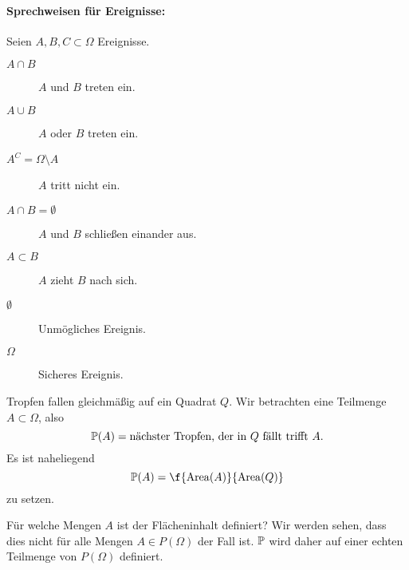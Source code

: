 \paragraph{Sprechweisen für Ereignisse:}
Seien $A, B, C \subset \Omega$ Ereignisse.
\begin{description}
	\item[$A \cap B$]
		$A$ und $B$ treten ein.
	\item[$A \cup B$]
		$A$ oder $B$ treten ein.
	\item[$A^C = \Omega \setminus A$]
		$A$ tritt nicht ein.
	\item[$A \cap B = \emptyset$]
		$A$ und $B$ schließen einander aus.
	\item[$A \subset B$]
		$A$ zieht $B$ nach sich.
	\item[$\emptyset$]
		Unmögliches Ereignis.
	\item[$\Omega$]
		Sicheres Ereignis.
\end{description}

\begin{ex} \label{0.2.6}
	Tropfen fallen gleichmäßig auf ein Quadrat $Q$.
	Wir betrachten eine Teilmenge $A \subset \Omega$, also
	\[
		\P(A) = \text{nächster Tropfen, der in $Q$ fällt trifft $A$}.
	\]
	Es ist naheliegend
	\[
		\P(A)
		= \f {\Area(A)}{\Area(Q)}
	\]
	zu setzen.

	Für welche Mengen $A$ ist der Flächeninhalt definiert?
	Wir werden sehen, dass dies nicht für alle Mengen $A \in P(\Omega)$ der Fall ist.
	$\P$ wird daher auf einer echten Teilmenge von $P(\Omega)$ definiert.
\end{ex}

